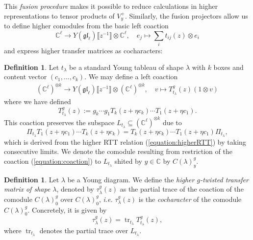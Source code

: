 \documentclass[11pt]{report}
\theoremstyle{definition}
\newtheorem{definition}[theorem]{Definition}
\theoremstyle{remark}
\theoremstyle{remark}
\newcommand{\C}{\mathbb{C}}
\begin{document}
This \emph{fusion procedure} makes it possible to reduce calculations in higher representations to tensor products of $V_y^+$. Similarly, the fusion projectors allow us to define higher comodules from the basic left coaction
\begin{equation*}
\C^\ell \to Y(\mathfrak{gl}_\ell)\llbracket z^{-1} \rrbracket \otimes \C^\ell, \quad e_j \mapsto \sum_i t_{ij}(z) \otimes e_i
\end{equation*}
and express higher transfer matrices as cocharacters:

\begin{definition}
Let $t_\lambda$ be a standard Young tableau of shape $\lambda$ with $k$ boxes and content vector $(c_1,...,c_k)$. We may define a left coaction
\begin{align}\label{equation:coaction}
(\C^\ell)^{\otimes k} \to Y(\mathfrak{gl}_\ell)\llbracket z^{-1} \rrbracket \otimes (\C^\ell)^{\otimes k}, \quad v \mapsto T_{t_\lambda}^g(z)(1 \otimes v)
\end{align}
where we have defined
\begin{equation*}
T_{t_\lambda}^g(z) := g_k \cdots g_1 T_k(z+\eta c_k) \cdots T_1(z+\eta c_1).
\end{equation*}
This coaction preserves the subspace $L_{t_\lambda} \subseteq (\C^\ell)^{\otimes k}$ due to
\begin{equation*}
\Pi_{t_\lambda} T_1(z+\eta c_1) \cdots T_k(z+\eta c_k) = T_k(z+\eta c_k) \cdots T_1(z+\eta c_1) \Pi_{t_\lambda},
\end{equation*}
which is derived from the higher RTT relation (\ref{equation:higherRTT}) by taking consecutive limits. We denote the comodule resulting from restriction of the coaction (\ref{equation:coaction}) to $L_{t_\lambda}$ shited by $y \in \C$ by $C(\lambda)_y^g$.
\end{definition}

\begin{definition}
Let $\lambda$ be a Young diagram. We define the \emph{higher $g$-twisted transfer matrix of shape $\lambda$}, denoted by $\tau_\lambda^g(z)$ as the partial trace of the coaction of the comodule $C(\lambda)_0^g$ over $C(\lambda)_0^g$, \emph{i.e.} $\tau_\lambda^g(z)$ is the \emph{cocharacter} of the comodule $C(\lambda)_0^g$. Concretely, it is given by
\begin{equation*}
\tau_\lambda^g(z) = \operatorname{tr}_{t_\lambda} T_{t_\lambda}^g(z),
\end{equation*}
where $\operatorname{tr}_{t_\lambda}$ denotes the partial trace over $L_{t_\lambda}$.
\end{definition}
\end{document}
